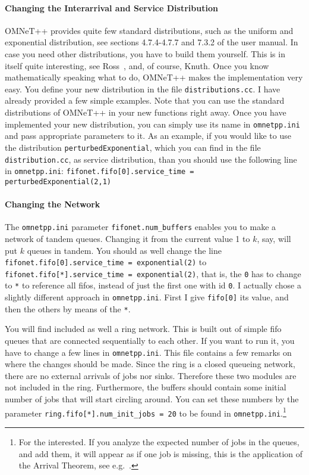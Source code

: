 \documentclass[a4paper]{article}
\begin{document}
\paragraph{Changing the Interarrival and Service Distribution}
\label{sec:chang-inter-serv-1}
OMNeT++ provides quite few standard distributions, such as the uniform
and exponential distribution, see sections 4.7.4-4.7.7 and 7.3.2 of the user
manual. In case you need other distributions, you have to build them
yourself. This is in itself quite interesting, see Ross~\cite{Ross93},
and, of course, Knuth\cite{Knuth97}. Once you know mathematically
speaking what to do, OMNeT++ makes the implementation very easy.  You
define your new distribution in the file \texttt{distributions.cc}. I
have already provided a few simple examples.  Note that you can use
the standard distributions of OMNeT++ in your new functions right
away. Once you have implemented your new distribution, you can simply
use its name in \texttt{omnetpp.ini} and pass appropriate parameters
to it. As an example, if you would like to use the distribution
\texttt{perturbedExponential}, which you can find in the file
\texttt{distribution.cc}, as service distribution, than you should use
the following line in \texttt{omnetpp.ini}:
\texttt{fifonet.fifo[0].service\_time = perturbedExponential(2,1)}

\paragraph{Changing the Network}
\label{sec:changing-network}
The \texttt{omnetpp.ini} parameter \texttt{fifonet.num\_buffers}
enables you to make a network of tandem queues. Changing it from the
current value 1 to $k$, say, will put $k$ queues in tandem. You should
as well change the line \texttt{fifonet.fifo[0].service\_time =
  exponential(2)} to \texttt{fifonet.fifo[*].service\_time =
  exponential(2)}, that is, the \texttt{0} has to change to \texttt{*}
to reference all fifos, instead of just the first one with id
\texttt{0}. I actually chose a slightly different approach in
\texttt{omnetpp.ini}. First I give \texttt{fifo[0]} its value, and
then the others by means of the \texttt{*}.

You will find included as well a ring network. This is built out of
simple fifo queues that are connected sequentially to each other. If
you want to run it, you have to change a few lines in
\texttt{omnetpp.ini}. This file contains a few remarks on where the
changes should be made. Since the ring is a closed queueing network,
there are no external arrivals of jobs nor sinks. Therefore these
two modules are not included in the ring. Furthermore, the buffers
should contain some initial number of jobs that will start circling
around. You can set these numbers by the parameter
\texttt{ring.fifo[*].num\_init\_jobs = 20} to be found in
\texttt{omnetpp.ini}.\footnote{For the interested. If you analyze the
  expected number of jobs in the queues, and add them, it will appear
  as if one job is missing, this is the application of the Arrival
  Theorem, see e.g.~\cite{Ross93}.}
\end{document}
